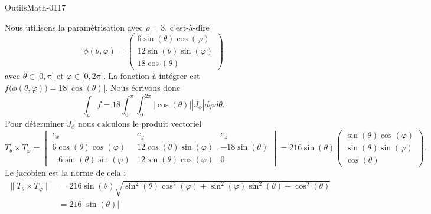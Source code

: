 
\begin{corrige}{OutilsMath-0117}

    Nous utilisons la paramétrisation avec \( \rho=3\), c'est-à-dire
    \begin{equation}
        \phi(\theta,\varphi)=\begin{pmatrix}
            6\sin(\theta)\cos(\varphi)    \\ 
            12\sin(\theta)\sin(\varphi)    \\ 
            18\cos(\theta)    
        \end{pmatrix}
    \end{equation}
    avec \( \theta\in\mathopen[ 0 , \pi \mathclose]\) et \( \varphi\in\mathopen[ 0 , 2\pi \mathclose]\). La fonction à intégrer est \( f\big( \phi(\theta,\varphi) \big)=18| \cos(\theta) |\). Nous écrivons donc
    \begin{equation}
        \int_{\phi}f=18\int_0^{\pi}\int_0^{2\pi}| \cos(\theta) | |J_{\phi} |d\varphi d\theta.
    \end{equation}
    Pour déterminer \( J_{\phi}\) nous calculons le produit vectoriel
    \begin{equation}
        T_{\theta}\times T_{\varphi}=\begin{vmatrix}
            e_x    &   e_y    &   e_z    \\
            6\cos(\theta)\cos(\varphi)    &  12\cos(\theta)\sin(\varphi)     &   -18\sin(\theta)    \\
            -6\sin(\theta)\sin(\varphi)    &   12\sin(\theta)\cos(\varphi)    &   0
        \end{vmatrix}=216\sin(\theta)\begin{pmatrix}
            \sin(\theta)\cos(\varphi)    \\ 
            \sin(\theta)\sin(\varphi)    \\ 
            \cos(\theta)    
        \end{pmatrix}.
    \end{equation}
    Le jacobien est la norme de cela :
    \begin{subequations}
        \begin{align}
            \| T_{\theta}\times T_{\varphi} \|&=216\sin(\theta)\sqrt{\sin^2(\theta)\cos^2(\varphi)+\sin^2(\varphi)\sin^2(\theta)+\cos^2(\theta)}\\
            &=216|\sin(\theta)|\\

\end{align}
\end{subequations}
\end{corrige}
